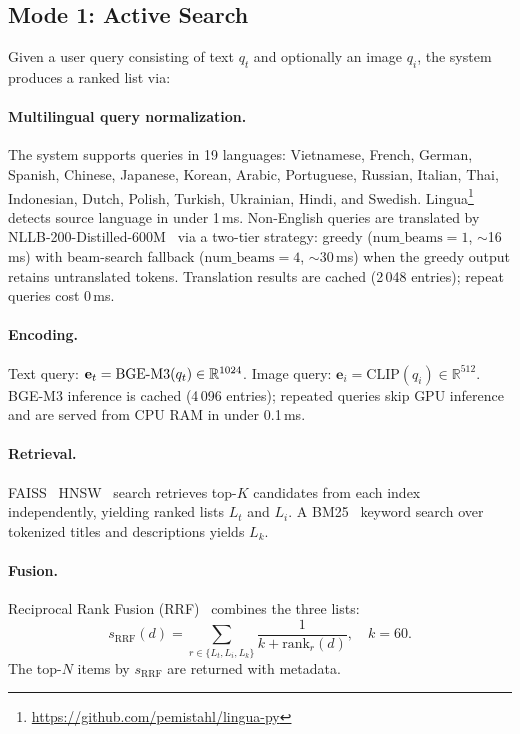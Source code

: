 \subsection{Mode 1: Active Search}
\label{ssec:active}

Given a user query consisting of text $q_t$ and optionally an image $q_i$,
the system produces a ranked list via:

\paragraph{Multilingual query normalization.}
The system supports queries in 19 languages: Vietnamese, French, German,
Spanish, Chinese, Japanese, Korean, Arabic, Portuguese, Russian, Italian,
Thai, Indonesian, Dutch, Polish, Turkish, Ukrainian, Hindi, and Swedish.
Lingua\footnote{\url{https://github.com/pemistahl/lingua-py}} detects source
language in under 1\,ms.
Non-English queries are translated by NLLB-200-Distilled-600M~\cite{costa2022nllb}
via a two-tier strategy: greedy ($\text{num\_beams}=1$, $\sim$16\,ms) with
beam-search fallback ($\text{num\_beams}=4$, $\sim$30\,ms) when the greedy
output retains untranslated tokens. Translation results are cached (2\,048
entries); repeat queries cost 0\,ms.

\paragraph{Encoding.}
Text query: $\mathbf{e}_t = \mathrm{BGE\text{-}M3}(q_t) \in \mathbb{R}^{1024}$.
Image query: $\mathbf{e}_i = \text{CLIP}(q_i) \in \mathbb{R}^{512}$.
BGE-M3 inference is cached (4\,096 entries); repeated queries skip GPU
inference and are served from CPU RAM in under 0.1\,ms.

\paragraph{Retrieval.}
FAISS~\cite{johnson2019faiss} HNSW~\cite{malkov2018efficient} search retrieves top-$K$ candidates from each index independently,
yielding ranked lists $L_t$ and $L_i$.
A BM25~\cite{robertson1994okapi} keyword search over tokenized titles and descriptions yields $L_k$.

\paragraph{Fusion.}
Reciprocal Rank Fusion (RRF)~\cite{cormack2009rrf} combines the three lists:
\begin{equation}
  s_{\text{RRF}}(d) = \sum_{r \in \{L_t, L_i, L_k\}}
  \frac{1}{k + \text{rank}_r(d)}, \quad k = 60.
  \label{eq:rrf}
\end{equation}
The top-$N$ items by $s_{\text{RRF}}$ are returned with metadata.

